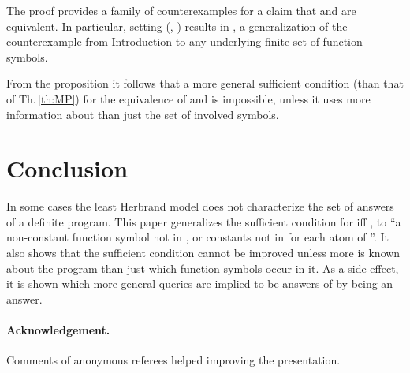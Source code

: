 \documentclass[a4paper]{tlp2}
\begin{document}
The proof provides a family of counterexamples for a claim that 
 and  are equivalent.
In particular, setting  (, ) results in 
,
a generalization 
of the counterexample from Introduction to any underlying
finite set  of function symbols.




From the proposition it follows that a more general sufficient condition
(than that of Th.\,\ref{th:MP}) for
the equivalence of  and  is impossible,
unless it uses more information about  than just the set of involved symbols.


\section{Conclusion}

In some cases the least Herbrand model does not characterize the set of
answers of a definite program.  
This paper generalizes the sufficient condition for
 iff , to
``a non-constant function symbol not in , or  constants not in 
for each atom  of ''.
It also shows
that the sufficient condition cannot be improved unless more is
known about the program than just which function symbols occur in it.
  As a side effect, it is shown
  which more general queries are implied to be answers of  by  being an
  answer. 





\paragraph{Acknowledgement.}
Comments of anonymous referees helped improving the presentation.



\end{document}
